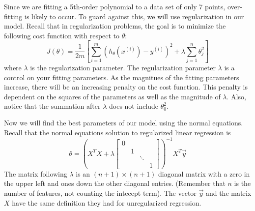\documentclass[10pt,a4paper]{article}
\begin{document}
  Since we are fitting a 5th-order polynomial to a data set of only 7 points, over-fitting is likely to occur. To guard against this, we will use regularization in our model. Recall that in regularization problems, the goal is to minimize the following cost function with respect to $\theta$:
  \begin{equation}
    J(\theta) =  \frac{{1}}{2m}\left[\sum_{i=1}^{m}(h_{\theta}(x^{(i)}) - y^{(i)})^2 + \lambda \sum^n_{j=1} \theta^2_j \right]
  \end{equation}
  where $\lambda$ is the regularization parameter. The regularization parameter $\lambda$ is a control on your fitting parameters. As the magnitues of the fitting parameters increase, there will be an increasing penalty on the cost function. This penalty is dependent on the squares of the parameters as well as the magnitude of $\lambda$. Also, notice that the summation after $\lambda$ does not include  $\theta_{0}^{2}.$

  Now we will find the best parameters of our model using the normal equations. Recall that the normal equations solution to regularized linear regression is 
  \begin{displaymath}
    \theta=(X^{T}X+\lambda\left[\begin{array}{cccc}
      0\\
      & 1\\
      & & \ddots\\
      & & & 1\end{array}\right])^{-1}X^{T}\vec{y}
  \end{displaymath}
  The matrix following $\lambda$ is an  $(n+1)\times(n+1)$ diagonal matrix with a zero in the upper left and ones down the other diagonal entries. (Remember that $n$ is the number of features, not counting the intecept term). The vector $\vec{y}$ and the matrix $X$ have the same definition they had for unregularized regression.
\end{document}
